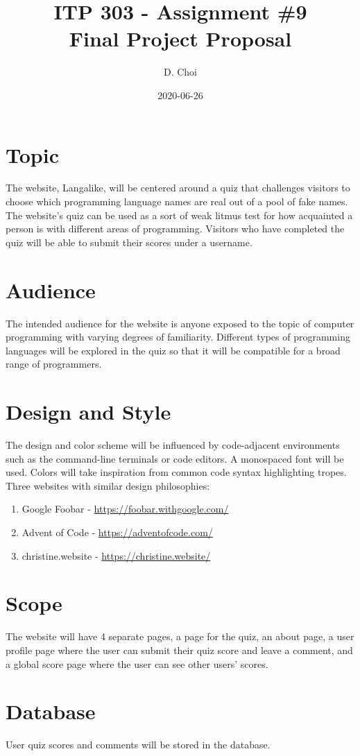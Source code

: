\documentclass[12pt]{article}
\title{\vspace{-4\baselineskip}ITP 303 - Assignment \#9 \\
Final Project Proposal}
\author{D. Choi}
\date{2020-06-26}
\begin{document}
\maketitle

\section*{Topic}
The website, Langalike, will be centered around a quiz that challenges
visitors to choose which programming language names are real out of a pool of
fake names. The website's quiz can be used as a sort of weak litmus test for
how acquainted a person is with different areas of programming. Visitors who
have completed the quiz will be able to submit their scores under a username.

\section*{Audience}
The intended audience for the website is anyone exposed to the topic of
computer programming with varying degrees of familiarity. Different types of
programming languages will be explored in the quiz so that it will be
compatible for a broad range of programmers.

\section*{Design and Style}
The design and color scheme will be influenced by code-adjacent environments
such as the command-line terminals or code editors. A monospaced font will be
used. Colors will take inspiration from common code syntax highlighting
tropes. \\[\baselineskip]
Three websites with similar design philosophies:
\begin{enumerate}
	\item Google Foobar - \url{https://foobar.withgoogle.com/}
	\item Advent of Code - \url{https://adventofcode.com/}
	\item christine.website - \url{https://christine.website/}
\end{enumerate}
\newpage

\section*{Scope}
The website will have 4 separate pages, a page for the quiz, an about page,
a user profile page where the user can submit their quiz score and leave a
comment, and a global score page where the user can see other users' scores.

\section*{Database}
User quiz scores and comments will be stored in the database.
\end{document}
